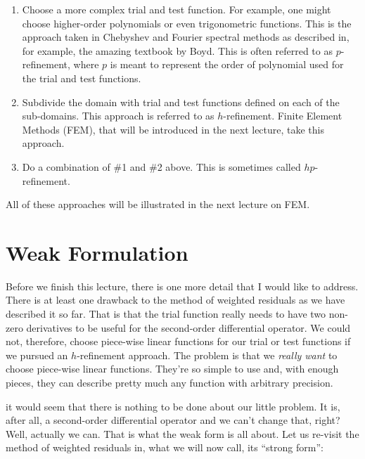 \begin{enumerate}
\item Choose a more complex trial and test function.  For example, one might choose higher-order polynomials or even trigonometric functions. This is the approach taken in Chebyshev and Fourier spectral methods as described in, for example, the amazing textbook by Boyd.\cite{boyd}  This is often referred to as $p$-refinement, where $p$ is meant to represent the order of polynomial used for the trial and test functions.

\item Subdivide the domain with trial and test functions defined on each of the sub-domains.  This approach is referred to as $h$-refinement.  Finite Element Methods (FEM), that will be introduced in the next lecture, take this approach.  

\item Do a combination of \#1 and \#2 above.  This is sometimes called $hp$-refinement.
\end{enumerate}  
All of these approaches will be illustrated in the next lecture on FEM.

\section{Weak Formulation}
Before we finish this lecture, there is one more detail that I would like to address.  There is at least one drawback to the method of weighted residuals as we have described it so far.  That is that the trial function really needs to have two non-zero derivatives to be useful for the second-order differential operator.  We could not, therefore, choose piece-wise linear functions for our trial or test functions if we pursued an $h$-refinement approach.  The problem is that we \emph{really want} to choose piece-wise linear functions.  They're so simple to use and, with enough pieces, they can describe pretty much any function with arbitrary precision.  

 it would seem that there is nothing to be done about our little problem.  It is, after all, a second-order differential operator and we can't change that, right?  Well, actually we can.  That is what the weak form is all about.  Let us re-visit the method of weighted residuals in, what we will now call, its ``strong form'':

